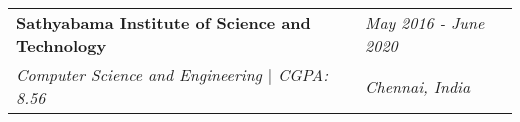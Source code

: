 \newcommand{\educationItem}[4]{
    \begin{tabularx}{\textwidth}{lX}
        \textbf{#1} & \hfill\textit{#2} \\ %
        \textit{#3} & \hfill\textit{#4} \\ %
    \end{tabularx}
}

\section{}

\educationItem{Sathyabama Institute of Science and Technology}{May 2016 - June 2020}{Computer Science and Engineering $|$ CGPA: 8.56}{Chennai, India}
